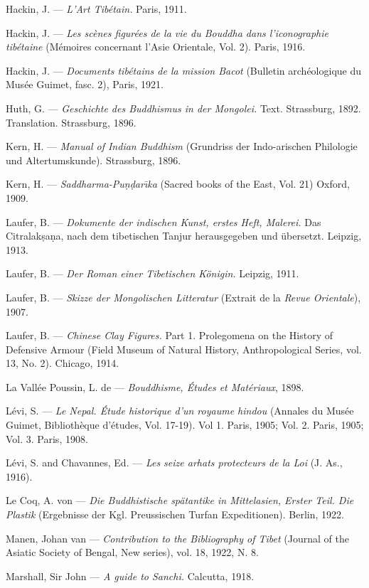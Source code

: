 \documentclass[a4paper, 12pt, oneside]{article}
\begin{document}
Hackin, J. --- \emph{L'Art Tibétain.} Paris, 1911.

Hackin, J. --- \emph{Les scènes figurées de la vie du Bouddha dans l'iconographie tibétaine} (Mémoires concernant l'Asie Orientale, Vol. 2). Paris, 1916.

Hackin, J. --- \emph{Documents tibétains de la mission Bacot} (Bulletin archéologique du Musée Guimet, fasc. 2), Paris, 1921.

Huth, G. --- \emph{Geschichte des Buddhismus in der Mongolei.} Text. Strassburg, 1892. Translation. Strassburg, 1896.

Kern, H. --- \emph{Manual of Indian Buddhism} (Grundriss der Indo-arischen Philologie und Altertumskunde). Strassburg, 1896.

Kern, H. --- \emph{Saddharma-Pu\d{n}\d{d}ar\={\i}ka} (Sacred books of the East, Vol. 21) Oxford, 1909.

Laufer, B. --- \emph{Dokumente der indischen Kunst, erstes Heft, Malerei.} Das Citralak\d{s}a\d{n}a, nach dem tibetischen Tanjur herausgegeben und übersetzt. Leipzig, 1913.

Laufer, B. --- \emph{Der Roman einer Tibetischen Königin.} Leipzig, 1911.

Laufer, B. --- \emph{Skizze der Mongolischen Litteratur} (Extrait de la \emph{Revue Orientale}), 1907.

Laufer, B. --- \emph{Chinese Clay Figures.} Part 1. Prolegomena on the History of Defensive Armour (Field Museum of Natural History, Anthropological Series, vol. 13, No. 2). Chicago, 1914.

La Vallée Poussin, L. de --- \emph{Bouddhisme, Études et Matériaux}, 1898.

Lévi, S. --- \emph{Le Nepal. Étude historique d'un royaume hindou} (Annales du Musée Guimet, Bibliothèque d'études, Vol. 17-19). Vol 1. Paris, 1905; Vol. 2. Paris, 1905; Vol. 3. Paris, 1908.

Lévi, S. and Chavannes, Ed. --- \emph{Les seize arhats protecteurs de la Loi} (J. As., 1916).

Le Coq, A. von --- \emph{Die Buddhistische spätantike in Mittelasien, Erster Teil. Die Plastik} (Ergebnisse der Kgl. Preussischen Turfan Expeditionen). Berlin, 1922.

Manen, Johan van --- \emph{Contribution to the Bibliography of Tibet} (Journal of the Asiatic Society of Bengal, New series), vol. 18, 1922, N. 8.

Marshall, Sir John --- \emph{A guide to Sanchi.} Calcutta, 1918.
\end{document}
